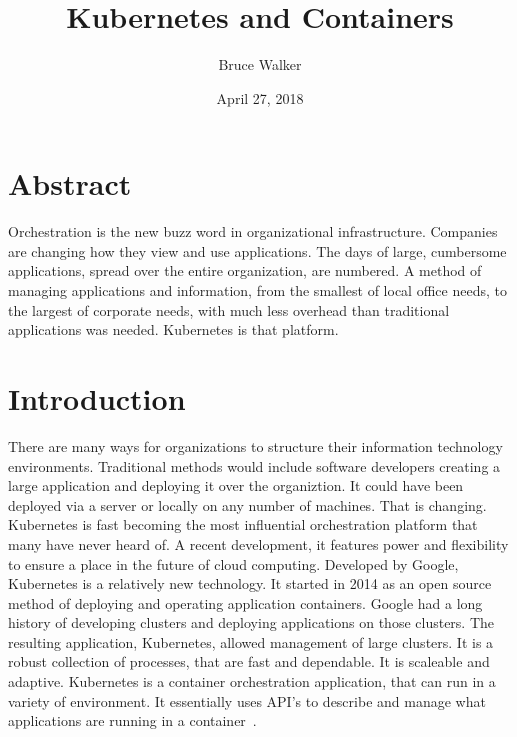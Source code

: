 
\title{Kubernetes and Containers}
\author{Bruce Walker}

 
\date{April 27, 2018}

\maketitle 
\section{Abstract}

Orchestration is the new buzz word in organizational infrastructure.
Companies are changing how they view and use applications.  The days
of large, cumbersome applications, spread over the entire
organization, are numbered.  A method of
managing applications and information, from the smallest of local 
office needs, to the largest of corporate needs, with much less 
overhead than traditional applications was needed.  Kubernetes is that 
platform.  



\section{Introduction}

There are many ways for organizations to structure their information
technology environments.  Traditional methods would include software
developers creating a large application and deploying it over the
organiztion. It could have been deployed via a server or locally on
any number of machines.  That is changing.  Kubernetes is fast 
becoming the most influential orchestration platform that
many have never heard of.  A recent development, it features power and
flexibility to ensure a place in the future of cloud computing.
Developed by Google, Kubernetes is a relatively new technology.  It
started in 2014 as an open source method of deploying and operating
application containers.  Google had a long history of developing
clusters and deploying applications on those clusters.  The resulting
application, Kubernetes, allowed management of large clusters. It is
a robust collection of processes, that are fast and dependable.  It is
scaleable and adaptive. Kubernetes is a container orchestration
application, that can run in a variety of environment.  It essentially
uses API's to describe and manage what applications are running in a 
container~\cite{concept}.

